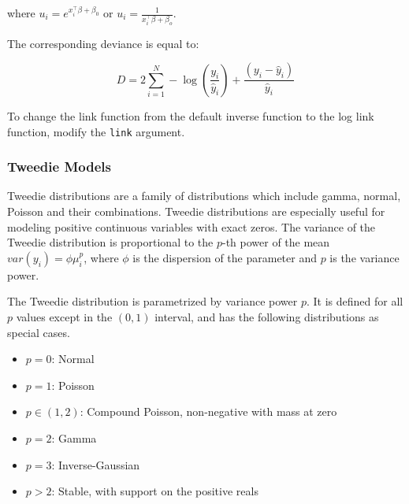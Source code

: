 where $u_i = e^{{x^{\top}_i} \beta + \beta_0}$ or $u_i = \frac{1}{x^{\top}_i \beta + \beta_o}$.

The corresponding deviance is equal to:

$$D = 2\sum_{i=1}^{N} - \log\left({\frac{ y_i }{\hat{y}_i}}\right) + \frac{(y_i - \hat{y}_i)}{\hat{y}_i} $$

To change the link function from the default inverse function to the log link function, modify the \texttt{link}
argument. 

\waterExampleInR



\waterExampleInPython


\subsubsection{Tweedie Models}

Tweedie distributions are a family of distributions which include gamma, normal, Poisson and their combinations. Tweedie distributions are especially useful for modeling positive continuous variables with exact zeros. The variance of the Tweedie distribution is proportional to the $p$-th power of the mean $var(y_i)=\phi \mu_i^p$, where $\phi$ is the dispersion of the parameter and $p$ is the variance power.

The Tweedie distribution is parametrized by variance power $p$. It is defined for all $p$ values except in the $(0,1)$ interval, and has the following distributions as special cases.

\begin{itemize}
\item  $p=0$: Normal
\item  $p=1$: Poisson
\item $p\in(1, 2)$: Compound Poisson, non-negative with mass at zero
\item $p=2$: Gamma
\item $p=3$: Inverse-Gaussian
\item $p>2$:  Stable, with support on the positive reals %
\end{itemize}

\waterExampleInR


\newpage
\waterExampleInPython


